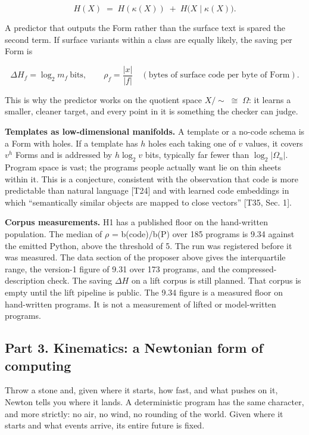 \documentclass[10pt,letterpaper]{article}
\begin{document}
\[
H(X)\;=\;H(\kappa(X))\;+\;H\big(X\mid\kappa(X)\big).
\]

A predictor that outputs the Form rather than the surface text is spared
the second term. If surface variants within a class are equally likely,
the saving per Form is

\[
\Delta H_f=\log_2 m_f\ \text{bits},\qquad \rho_f=\frac{\lvert x\rvert}{\lvert f\rvert}\quad(\text{bytes of surface code per byte of Form}).
\]

This is why the predictor works on the quotient space
\(X/\!\sim\;\cong\;\Omega\): it learns a smaller, cleaner target, and
every point in it is something the checker can judge.

\textbf{Templates as low-dimensional manifolds.} A template or a no-code
schema is a Form with holes. If a template has \(h\) holes each taking
one of \(v\) values, it covers \(v^h\) Forms and is addressed by
\(h\log_2 v\) bits, typically far fewer than
\(\log_2\lvert\Omega_n\rvert\). Program space is vast; the programs
people actually want lie on thin sheets within it. This is a conjecture,
consistent with the observation that code is more predictable than
natural language {[}T24{]} and with learned code embeddings in which
``semantically similar objects are mapped to close vectors'' {[}T35,
Sec. 1{]}.

\textbf{Corpus measurements.} H1 has a published floor on the
hand-written population. The median of \(\rho\) = b(code)/b(P) over 185
programs is 9.34 against the emitted Python, above the threshold of 5.
The run was registered before it was measured. The data section of the
proposer above gives the interquartile range, the version-1 figure of
9.31 over 173 programs, and the compressed-description check. The saving
\(\Delta H\) on a lift corpus is still planned. That corpus is empty
until the lift pipeline is public. The 9.34 figure is a measured floor
on hand-written programs. It is not a measurement of lifted or
model-written programs.

\subsection{Part 3. Kinematics: a Newtonian form of
computing}\label{part-3.-kinematics-a-newtonian-form-of-computing}

Throw a stone and, given where it starts, how fast, and what pushes on
it, Newton tells you where it lands. A deterministic program has the
same character, and more strictly: no air, no wind, no rounding of the
world. Given where it starts and what events arrive, its entire future
is fixed.
\end{document}
